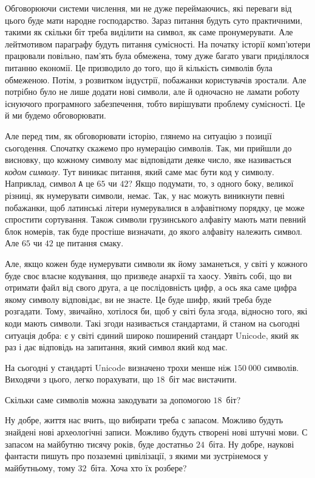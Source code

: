 \documentclass{book}
\newcommand{\bitstr}[1]{{\tt #1}}
\begin{document}
Обговорюючи системи числення, ми не дуже переймаючись, які переваги від цього буде мати народне господарство.
Зараз питання будуть суто практичними, такими як скільки біт треба виділити на символ, як саме пронумерувати.
Але лейтмотивом параграфу будуть питання сумісності.
На початку історії комп'ютери працювали повільно, пам'ять була обмежена, тому дуже багато уваги приділялося питанню економії.
Це призводило до того, що й кількість символів була обмеженою.
Потім, з розвитком індустрії, побажанки користувачів зростали.
Але потрібно було не лише додати нові символи, але й одночасно не ламати роботу існуючого програмного забезпечення, тобто вирішувати проблему сумісності.
Це й ми будемо обговорювати.

Але перед тим, як обговорювати історію, глянемо на ситуацію з позиції сьогодення.
Спочатку скажемо про нумерацію символів.
Так, ми прийшли до висновку, що кожному символу має відповідати деяке число, яке називається \textit{кодом символу}.
Тут виникає питання, який саме має бути код у символу.
Наприклад, символ \bitstr{A} це $65$ чи $42$?
Якщо подумати, то, з одного боку, великої різниці, як нумерувати символи, немає.
Так, у нас можуть виникнути певні побажанки, щоб латинські літери нумерувалися в алфавітному порядку, це може спростити сортування.
Також символи грузинського алфавіту мають мати певний блок номерів, так буде простіше визначати, до якого алфавіту належить символ.
Але $65$ чи $42$ це питання смаку.

Але, якщо кожен буде нумерувати символи як йому заманеться, у світі у кожного буде своє власне кодування, що призведе анархії та хаосу.
Уявіть собі, що ви отримати файл від свого друга, а це послідовність цифр, а ось яка саме цифра якому символу відповідає, ви не знаєте.
Це буде шифр, який треба буде розгадати.
Тому, звичайно, хотілося би, щоб у світі була згода, відносно того, які коди мають символи.
Такі згоди називається стандартами, й станом на сьогодні ситуація добра: є у світі єдиний широко поширений стандарт Unicode, який як раз і дає відповідь на запитання, який символ який код має.

На сьогодні у стандарті Unicode визначено трохи менше ніж $150~000$ символів.
Виходячи з цього, легко порахувати, що $18$~біт має вистачити.

\begin{exercise}
Скільки саме символів можна закодувати за допомогою $18$~біт?
\end{exercise}

Ну добре, життя нас вчить, що вибирати треба с запасом.
Можливо будуть знайдені нові археологічні записи.
Можливо будуть створені нові штучні мови.
С запасом на майбутню тисячу років, буде достатньо $24$~біта.
Ну добре, наукові фантасти пишуть про позаземні цивілізації, з якими ми зустрінемося у майбутньому, тому $32$~біта.
Хоча хто їх розбере?
\end{document}
